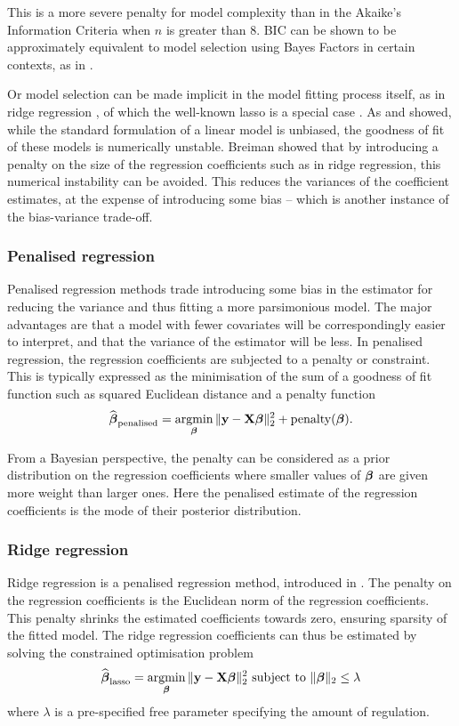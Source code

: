 \noindent This is a more severe penalty for model complexity than in the Akaike's Information Criteria when
$n$ is greater than $8$. BIC can be shown to be approximately equivalent to model selection using Bayes
Factors in certain contexts, as in \cite{Kass1993}.

Or model selection can be made implicit in the model fitting process itself, as in ridge regression
\citep{Casella1980}, of which the well-known lasso is a special case \citep{Tibshirani1996}. As
\citep{Breiman1996} and \citep{Efron2013} showed, while  the standard formulation of a linear model is
unbiased, the goodness of fit of these models is numerically  unstable. Breiman showed that by introducing a
penalty on the size of the regression coefficients such as  in ridge regression, this numerical instability
can be avoided. This reduces the variances of the coefficient estimates, at the expense of introducing some
bias -- which is another instance of the bias-variance trade-off.

\subsubsection{Penalised regression}
Penalised regression methods trade introducing some bias in the estimator for reducing the variance and thus
fitting a more parsimonious model. The major advantages are that a model with fewer covariates will be
correspondingly easier to interpret, and that the variance of the estimator will be less. In penalised
regression, the regression coefficients are subjected to a penalty or constraint. This is typically
expressed as the minimisation of the sum of a goodness of fit function such as squared Euclidean distance
and a penalty function
$$
\widehat{\vbeta}_{\text{penalised}} = \argmin_\vbeta \|\vy - \mX \vbeta\|_2^2 + \text{penalty}(\vbeta).
$$

From a Bayesian perspective, the penalty can be considered as a prior distribution on the regression 
coefficients where smaller values of ${\boldsymbol \beta}$ are given more weight than larger ones. Here the penalised
estimate of the regression coefficients is the mode of their posterior distribution.

\subsubsection{Ridge regression}
Ridge regression is a penalised regression method, introduced in \cite{Hoerl1970}. The penalty on the
regression coefficients is the Euclidean norm of the regression coefficients. This penalty shrinks the
estimated coefficients towards zero, ensuring sparsity of the fitted model. The ridge regression coefficients
can thus be estimated by solving the constrained optimisation problem
$$
\widehat{\vbeta}_{\text{lasso}} = \argmin_\vbeta \|\vy - \mX \vbeta\|_2^2 \text{ subject to } \|\vbeta\|_2 \leq \lambda
$$
where $\lambda$ is a pre-specified free parameter specifying the amount of regulation.


